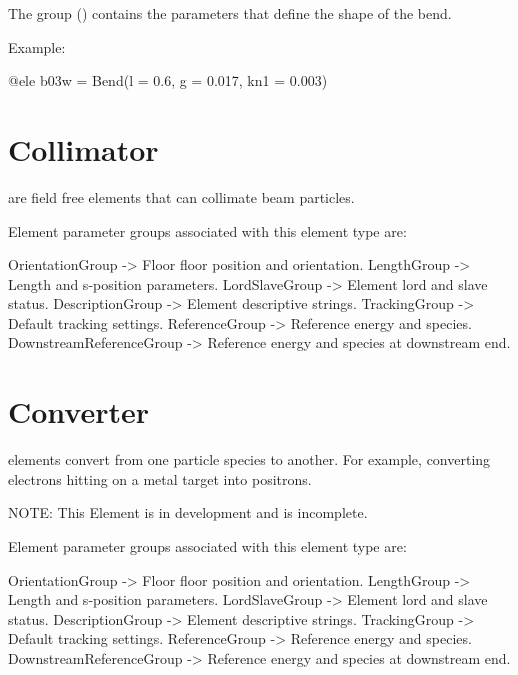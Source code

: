 The  group () contains the parameters that define the shape of the bend.

Example:
\begin{example}
  @ele b03w = Bend(l = 0.6, g = 0.017, kn1 = 0.003)
\end{example}

\newpage

\section{Collimator}
\label{s:collimator}

 are field free elements that can collimate beam particles.

Element parameter groups associated with this element type are:
\TOPrule
\begin{example}
  OrientationGroup -> Floor floor position and orientation.  
  LengthGroup        -> Length and s-position parameters.  
  LordSlaveGroup     -> Element lord and slave status.  
  DescriptionGroup   -> Element descriptive strings.  
  TrackingGroup      -> Default tracking settings.  
  ReferenceGroup     -> Reference energy and species. 
  DownstreamReferenceGroup -> Reference energy and species at downstream end. 
\end{example}
\BOTTOMrule

\section{Converter}
\label{s:converter}

 elements convert from one particle species to another. 
For example, converting electrons hitting on a metal target into positrons.

NOTE: This Element is in development and is incomplete.

Element parameter groups associated with this element type are:
\TOPrule
\begin{example}
  OrientationGroup -> Floor floor position and orientation.  
  LengthGroup        -> Length and s-position parameters.  
  LordSlaveGroup     -> Element lord and slave status.  
  DescriptionGroup   -> Element descriptive strings.  
  TrackingGroup      -> Default tracking settings.  
  ReferenceGroup     -> Reference energy and species. 
  DownstreamReferenceGroup -> Reference energy and species at downstream end. 
\end{example}
\BOTTOMrule

